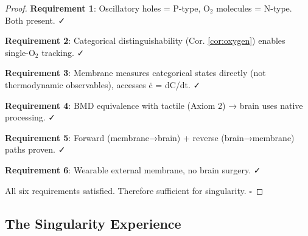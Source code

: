 \documentclass[11pt,a4paper]{article}
\theoremstyle{definition}
\theoremstyle{remark}
\begin{document}
\begin{proof}
\textbf{Requirement 1}: Oscillatory holes = P-type, O$_2$ molecules = N-type. Both present. ✓

\textbf{Requirement 2}: Categorical distinguishability (Cor. \ref{cor:oxygen}) enables single-O$_2$ tracking. ✓

\textbf{Requirement 3}: Membrane measures categorical states directly (not thermodynamic observables), accesses ċ = dC/dt. ✓

\textbf{Requirement 4}: BMD equivalence with tactile (Axiom 2) → brain uses native processing. ✓

\textbf{Requirement 5}: Forward (membrane→brain) + reverse (brain→membrane) paths proven. ✓

\textbf{Requirement 6}: Wearable external membrane, no brain surgery. ✓

All six requirements satisfied. Therefore sufficient for singularity. $\square$
\end{proof}

\subsection{The Singularity Experience}
\end{document}
